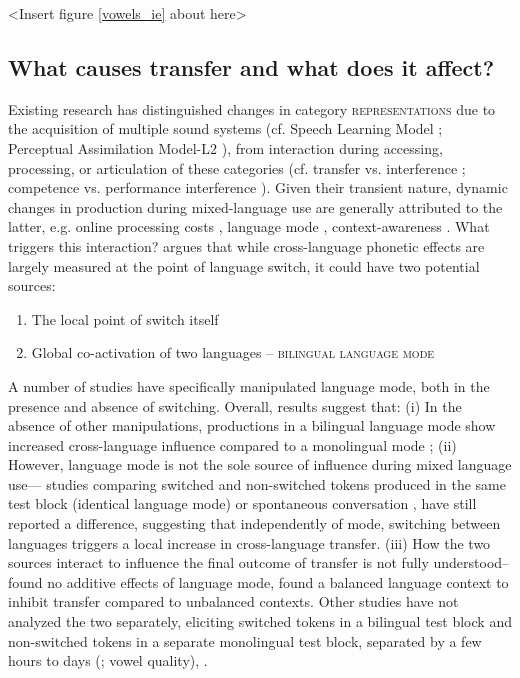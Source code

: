 \documentclass[12 pt]{article}
\begin{document}
<Insert figure \ref{vowels_ie} about here>

\subsection{What causes transfer and what does it affect?}\label{causes}

Existing research has distinguished changes in category \textsc{representations} due to the acquisition of multiple sound systems (cf. Speech Learning Model \citep{flege1995second,flege2007language}; Perceptual Assimilation Model-L2 \citep{best2007nonnative}), from interaction during accessing, processing, or articulation of these categories (cf. transfer vs. interference \citep{grosjean2012attempt}; competence vs. performance interference \citep{paradis1993linguistic}). 
Given their transient nature, dynamic changes in production during mixed-language use are generally attributed to the latter, e.g. online processing costs \citep[][VOT]{olson2013bilingual,tsui2019impact,vsimavckova2015immediate}, language mode \citep[][vowel quality]{simonet2014phonetic}, context-awareness \citep[][phonological variables]{khattab2013phonetic}. What triggers this interaction? \cite{olson2016role} argues that while cross-language phonetic effects are largely measured at the point of language switch, it could have two potential sources:
\begin{enumerate}
	\item The local point of switch itself
	\item Global co-activation of two languages -- \textsc{bilingual language mode} \citep{grosjean1998studying} 
\end{enumerate}

A number of studies have specifically manipulated language mode, both in the presence and absence of switching. Overall, results suggest that: (i) In the absence of other manipulations, productions in a bilingual language mode show increased cross-language influence compared to a monolingual mode \citep[][vowel quality]{simonet2020increased,simonet2014phonetic}; (ii) However, language mode is not the sole source of influence during mixed language use--- studies comparing switched and non-switched tokens produced in the same test block (identical language mode) \citep[][VOT]{olson2016role,tsui2019impact} or spontaneous conversation \citep[][VOT]{piccinini2015voice}, have still reported a difference, suggesting that independently of mode, switching between languages triggers a local increase in cross-language transfer. (iii) How the two sources interact to influence the final outcome of transfer is not fully understood-- \cite[][VOT]{olson2016role} found no additive effects of language mode, \cite[][VOT]{olson2013bilingual} found a balanced language context to inhibit transfer compared to unbalanced contexts.  Other studies have not analyzed the two separately, eliciting switched tokens in a bilingual test block and non-switched tokens in a separate monolingual test block, separated by a few hours to days (\cite{elias2017effects}; vowel quality), \citep[][VOT]{schwartz2015language, bullock2009trying,antoniou2011inter, vsimavckova2015immediate,vsimavckova2018patterns}.
\end{document}

